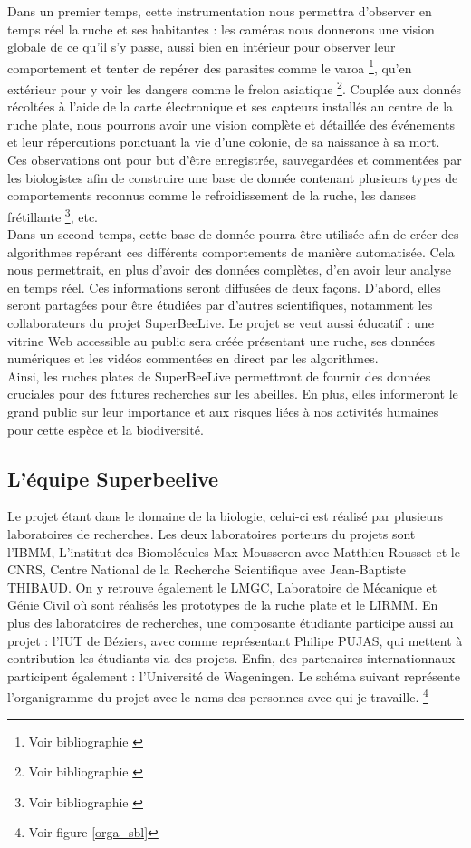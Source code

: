 \documentclass[11pt,french,a4paper]{report}
\begin{document}
Dans un premier temps, cette instrumentation nous permettra d'observer en temps réel la ruche et ses habitantes : 
les caméras nous donnerons une vision globale de ce qu'il s'y passe, aussi bien en intérieur pour observer leur 
comportement et tenter de repérer des parasites comme le varoa \footnote{Voir bibliographie \cite{site5}}, 
qu'en extérieur pour y voir les dangers comme le frelon asiatique \footnote{Voir bibliographie \cite{site6}}.
Couplée aux donnés récoltées à l'aide de la carte électronique et ses capteurs installés au centre de la ruche plate, 
nous pourrons avoir une vision complète et détaillée des événements et leur répercutions ponctuant la vie d'une colonie,
de sa naissance à sa mort. \\
Ces observations ont pour but d'être enregistrée, sauvegardées et commentées par les biologistes afin de construire une base
de donnée contenant plusieurs types de comportements reconnus comme le refroidissement de la ruche, les danses frétillante \footnote{Voir bibliographie \cite{ref10}}, 
etc.  
\\
Dans un second temps, cette base de donnée pourra être utilisée afin de créer des algorithmes repérant ces différents comportements
de manière automatisée. Cela nous permettrait, en plus d'avoir des données complètes, d'en avoir leur analyse en 
temps réel. Ces informations seront diffusées de deux façons. D'abord, elles seront partagées pour être étudiées par d'autres scientifiques, 
notamment les collaborateurs du projet SuperBeeLive. Le projet se veut aussi éducatif : une vitrine Web accessible au public 
sera créée présentant une ruche, ses données numériques et les vidéos commentées en direct par les algorithmes. \\


Ainsi, les ruches plates de SuperBeeLive permettront de fournir des données cruciales pour des futures recherches sur les 
abeilles. En plus, elles informeront le grand public sur leur importance et aux risques liées à nos activités humaines pour 
cette espèce et la biodiversité. 


\subsection{L'équipe Superbeelive}
Le projet étant dans le domaine de la biologie, celui-ci est réalisé par plusieurs laboratoires de recherches. 
Les deux laboratoires porteurs du projets sont l'IBMM, L'institut des Biomolécules Max Mousseron avec Matthieu Rousset
et le CNRS, Centre National de la Recherche Scientifique avec Jean-Baptiste THIBAUD. On y retrouve également le LMGC, Laboratoire
de Mécanique et Génie Civil où sont réalisés les prototypes de la ruche plate et le LIRMM. 
En plus des laboratoires de recherches, une composante étudiante participe aussi au projet : l'IUT de Béziers, avec comme représentant
Philipe PUJAS, qui mettent à contribution les étudiants via des projets. Enfin, des partenaires internationnaux participent également :
l'Université de Wageningen. 
Le schéma suivant représente l'organigramme du projet avec le noms des personnes avec qui je travaille. \footnote{Voir figure \ref{orga_sbl}}
\end{document}
